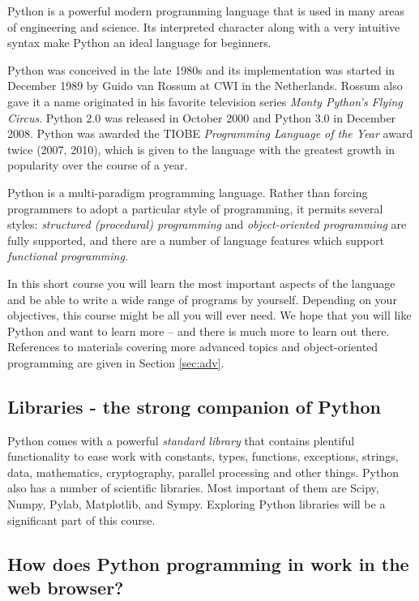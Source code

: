\documentclass[article,A4,12pt]{llncs}
\begin{document}
Python is a powerful modern programming language that is used in many areas of 
engineering and science. Its interpreted character along with a very intuitive syntax make Python an 
ideal language for beginners. 

Python was conceived in the late 1980s and its implementation was started in December 1989
by Guido van Rossum at CWI in the Netherlands. Rossum also gave it a name originated
in his favorite television series {\em Monty Python's Flying Circus}.
Python 2.0 was released in October 2000 and Python 3.0 in December 2008. Python was
awarded the TIOBE {\em Programming Language of the Year} award twice (2007, 2010), which is 
given to the language with the greatest growth in popularity over the course of a year.

Python is a multi-paradigm programming language. Rather than forcing programmers to 
adopt a particular style of programming, it permits several styles: {\em structured (procedural) 
programming} and {\em object-oriented programming} are fully supported, and there are a number 
of language features which support {\em functional programming}. 

In this short course you will 
learn the most important aspects of the language and be able to 
write a wide range of programs by yourself. Depending on your objectives, this course 
might be all you will ever need. We hope that you will like Python and want
to learn more -- and there is much more to learn out there. References to materials
covering more advanced topics and object-oriented programming are given in Section \ref{sec:adv}.

\subsection{Libraries - the strong companion of Python}

Python comes with a powerful {\em standard library} that contains plentiful functionality
to ease work with constants, types, functions, exceptions, strings, data, 
mathematics, cryptography, parallel processing and other things. 
Python also has a number of scientific libraries. Most important of them are Scipy, 
Numpy, Pylab, Matplotlib, and Sympy. Exploring Python libraries will be a significant 
part of this course. 

\subsection{How does Python programming in work in the web browser?}
\end{document}
